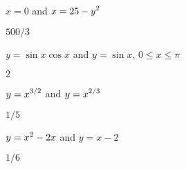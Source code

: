 \begin{exercises}
\begin{exercise} $x=0$ and $\displaystyle x=25-y^2$
\begin{answer} $500/3$
\end{answer}\end{exercise}

\begin{exercise} $y=\sin x\cos x$ and $y=\sin x$, $0\le x\le \pi$
\begin{answer} $2$
\end{answer}\end{exercise}

\begin{exercise} $\displaystyle y=x^{3/2}$ and $\displaystyle y=x^{2/3}$
\begin{answer} $1/5$
\end{answer}\end{exercise}

\begin{exercise} $\displaystyle y=x^2-2x$ and $y=x-2$
\begin{answer} $1/6$
\end{answer}\end{exercise}



\end{exercises}

